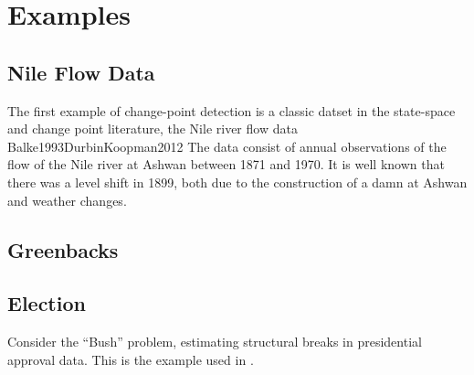 \documentclass{article}
\begin{document}
\section{Examples}
\label{sec:examples}

\subsection{Nile Flow Data}
\label{sec:nile}

The first example of change-point detection is a classic datset in the state-space and change point literature, the Nile river flow data \textcite{Cobb1978}{Balke1993}{DurbinKoopman2012}
The data consist of annual observations of the flow of the Nile river at Ashwan between 1871 and 1970. 
It is well known that there was a level shift in 1899, both due to the construction of a damn at Ashwan and weather changes.

\subsection{Greenbacks}
\label{sec:greenbacks-graybacks}

\subsection{Election}
\label{sec:election}

Consider the ``Bush'' problem, estimating structural breaks in
presidential approval data. This is the example used in
\textcite{RatkovicEng2010}.

\printbibliography{}
\end{document}
